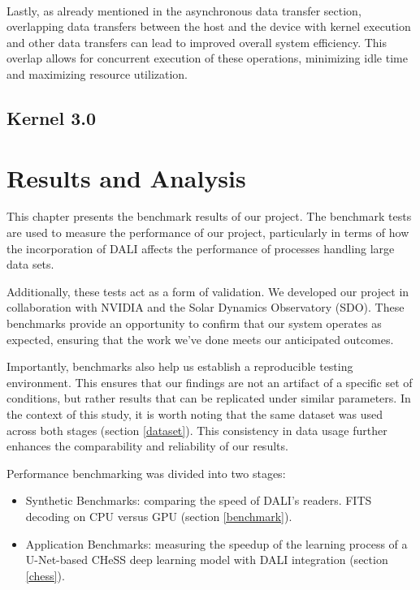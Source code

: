 \documentclass[licencjacka,en]{pracamgr}
\begin{document}
\\




Lastly, as already mentioned in the asynchronous data transfer section, overlapping data transfers between the host and the device with kernel execution and other data transfers can lead to improved overall system efficiency. This overlap allows for concurrent execution of these operations, minimizing idle time and maximizing resource utilization.




\section{Kernel 3.0}


\chapter{Results and Analysis}\label{r:results}
This chapter presents the benchmark results of our project. The benchmark tests are used to measure the performance of our project, particularly in terms of how the incorporation of DALI affects the performance of processes handling large data sets. 

Additionally, these tests act as a form of validation. We developed our project in collaboration with NVIDIA and the Solar Dynamics Observatory (SDO). These benchmarks provide an opportunity to confirm that our system operates as expected, ensuring that the work we've done meets our anticipated outcomes.

Importantly, benchmarks also help us establish a reproducible testing environment. This ensures that our findings are not an artifact of a specific set of conditions, but rather results that can be replicated under similar parameters. In the context of this study, it is worth noting that the same dataset was used across both stages (section \ref{dataset}). This consistency in data usage further enhances the comparability and reliability of our results.

Performance benchmarking was divided into two stages:
\begin{itemize}
    \item Synthetic Benchmarks: comparing the speed of DALI's readers. FITS decoding on CPU versus GPU (section \ref{benchmark}).
    \item Application Benchmarks: measuring the speedup of the learning process of a U-Net-based CHeSS deep learning model \cite{CHeSS} with DALI integration (section \ref{chess}).
\end{itemize}
\end{document}
